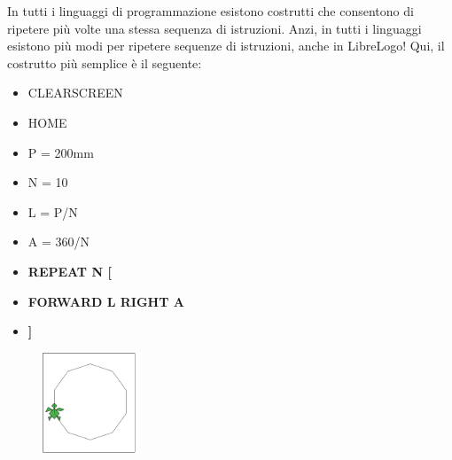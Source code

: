 In tutti i linguaggi di programmazione esistono costrutti che consentono di ripetere più volte una stessa sequenza di istruzioni. Anzi, in tutti i linguaggi esistono più modi per ripetere sequenze di istruzioni, anche in LibreLogo! Qui, il costrutto più semplice è il seguente:
    
\begin{scriptsize}
\begin{minipage}{0.40\textwidth}
\begin{itemize}[itemsep=-3pt,parsep=2pt]
\item[] CLEARSCREEN                 
\item[] HOME
\item[] P = 200mm
\item[] N = 10
\item[] L = P/N
\item[] A = 360/N
\item[] \textbf{REPEAT N [}
\item[]  \hspace{0.5cm}	\textbf{FORWARD L RIGHT A}
\item[] \textbf{]}                           
\end{itemize}
\end{minipage}
\end{scriptsize}
\begin{minipage}{0.4\textwidth}
\begin{figure}[H]
   \includegraphics[width=3.0cm,trim=4 4 8 4,clip]{./images/ripetere/ripetere-4.png}
   \label{rip-4}
\end{figure}
\end{minipage} \hfill

\vskip 1cm

